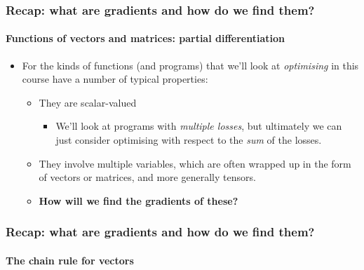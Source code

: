 \documentclass[]{article}
\begin{document}
\begin{frame}
\frametitle{Recap: what are gradients and how do we find them?}
\framesubtitle{Functions of vectors and matrices: partial differentiation}
\begin{itemize}
	\item<+-> For the kinds of functions (and programs) that we'll look at \emph{optimising} in this course have a number of typical properties:
	\begin{itemize}
		\item<+-> They are scalar-valued
		\begin{itemize}
			\item We'll look at programs with \emph{multiple losses}, but ultimately we can just consider optimising with respect to the \emph{sum} of the losses.
		\end{itemize}
		\item<+-> They involve multiple variables, which are often wrapped up in the form of vectors or matrices, and more generally tensors.
		\item<+-> \textbf{How will we find the gradients of these?}
	\end{itemize}
\end{itemize}
\end{frame}

\begin{frame}
\frametitle{Recap: what are gradients and how do we find them?}
\framesubtitle{The chain rule for vectors}



\end{frame}
\end{document}
